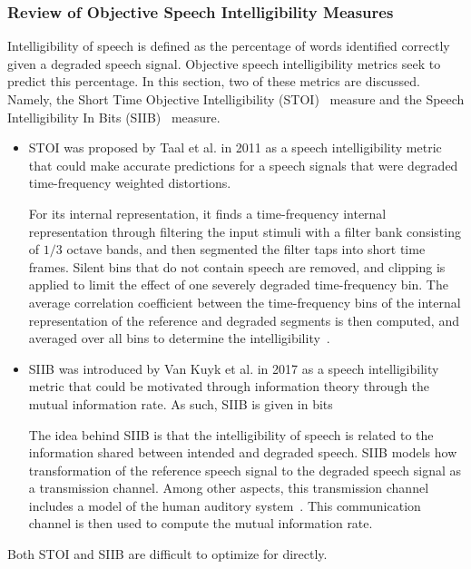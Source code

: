 \subsubsection{Review of Objective Speech Intelligibility Measures}
Intelligibility of speech is defined as the percentage of words identified correctly given a degraded speech signal.
Objective speech intelligibility metrics seek to predict this percentage.
In this section, two of these metrics are discussed.
Namely, the Short Time Objective Intelligibility (STOI)~\cite{taal2011algorithm} measure and the 
Speech Intelligibility In Bits (SIIB)~\cite{van2017instrumental} measure.

\begin{itemize}
    \item 
    STOI was proposed by Taal et al. in 2011 as a speech intelligibility metric that could make accurate predictions 
    for a speech signals that were degraded time-frequency weighted distortions.

    For its internal representation, it finds a time-frequency internal representation through filtering the input stimuli with a filter bank consisting of 
    $1/3$ octave bands, and then segmented the filter taps into short time frames.
    Silent bins that do not contain speech are removed, and clipping is applied to limit the effect of one severely degraded time-frequency bin.
    The average correlation coefficient between the time-frequency bins of the internal representation of the reference and degraded 
    segments is then computed, and averaged over all bins to determine the intelligibility~\cite{taal2011algorithm}.
    \item 
    SIIB was introduced by Van Kuyk et al. in 2017 as a speech intelligibility metric that could be motivated through
    information theory through the mutual information rate.
    As such, SIIB is given in bits

    The idea behind SIIB is that the intelligibility of speech is related to the information shared between 
    intended and degraded speech.
    SIIB models how transformation of the reference speech signal to the degraded speech signal as a transmission channel.
    Among other aspects, this transmission channel includes a model of the human auditory system~\cite{van2017instrumental}.
    This communication channel is then used to compute the mutual information rate.
\end{itemize}

Both STOI and SIIB are difficult to optimize for directly. 

